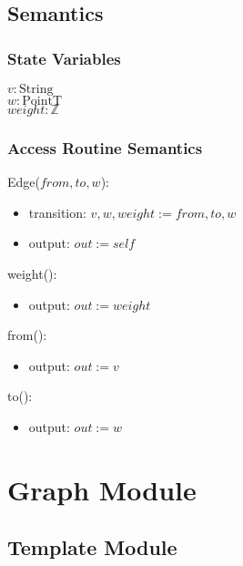 \documentclass[12pt]{article}
\begin{document}
\subsection* {Semantics}

\subsubsection* {State Variables}

$\mathit{v}: \text{String}$\\
$\mathit{w}: \text{PointT}$\\
$\mathit{weight}: \mathbb{Z}$\\

\subsubsection* {Access Routine Semantics}

Edge($from, to, w$):
\begin{itemize}
\item transition: $v, w, weight := from, to, w$ 

\item output: $\mathit{out} := \mathit{self}$
\end{itemize}


\noindent weight():
\begin{itemize}
\item output: $\mathit{out} := weight$
\end{itemize}

\noindent from():
\begin{itemize}
\item output: $\mathit{out} := v$
\end{itemize}

\noindent to():
\begin{itemize}
\item output: $\mathit{out} := w$
\end{itemize}




\newpage

\section* {Graph Module}

\subsection* {Template Module}
\end{document}
